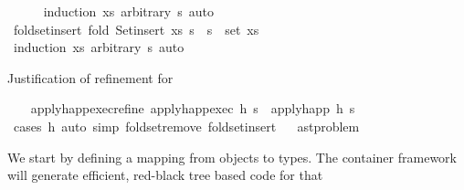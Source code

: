 \begin{isabellebody}
%
\isadelimproof
\ \ \ \ %
\endisadelimproof
%
\isatagproof
{}\isamarkupfalse%
\ {\isacharparenleft}{\kern0pt}induction\ xs\ arbitrary{\isacharcolon}{\kern0pt}\ s{\isacharparenright}{\kern0pt}\ auto%
\endisatagproof
{\isafoldproof}%
%
\isadelimproof
\isanewline
%
\endisadelimproof
\isanewline
\ \ \isamarkupfalse%
\ fold{\isacharunderscore}{\kern0pt}set{\isacharunderscore}{\kern0pt}insert{\isacharcolon}{\kern0pt}\ {\isachardoublequoteopen}fold\ Set{\isachardot}{\kern0pt}insert\ xs\ s\ {\isacharequal}{\kern0pt}\ s\ {\isasymunion}\ set\ xs{\isachardoublequoteclose}\isanewline
%
\isadelimproof
\ \ \ \ %
\endisadelimproof
%
\isatagproof
{}\isamarkupfalse%
\ {\isacharparenleft}{\kern0pt}induction\ xs\ arbitrary{\isacharcolon}{\kern0pt}\ s{\isacharparenright}{\kern0pt}\ auto%
\endisatagproof
{\isafoldproof}%
%
\isadelimproof
%
\endisadelimproof
%
\begin{isamarkuptext}%
Justification of refinement for %
\end{isamarkuptext}\isamarkuptrue%
\ \ \isamarkupfalse%
\ apply{\isacharunderscore}{\kern0pt}happ{\isacharunderscore}{\kern0pt}exec{\isacharunderscore}{\kern0pt}refine{\isacharcolon}{\kern0pt}\ {\isachardoublequoteopen}apply{\isacharunderscore}{\kern0pt}happ{\isacharunderscore}{\kern0pt}exec\ h\ s\ {\isacharequal}{\kern0pt}\ apply{\isacharunderscore}{\kern0pt}happ\ h\ s{\isachardoublequoteclose}\isanewline
%
\isadelimproof
\ \ \ \ %
\endisadelimproof
%
\isatagproof
{}\isamarkupfalse%
\ {\isacharparenleft}{\kern0pt}cases\ h{\isacharparenright}{\kern0pt}\ {\isacharparenleft}{\kern0pt}auto\ simp{\isacharcolon}{\kern0pt}\ fold{\isacharunderscore}{\kern0pt}set{\isacharunderscore}{\kern0pt}remove\ fold{\isacharunderscore}{\kern0pt}set{\isacharunderscore}{\kern0pt}insert{\isacharparenright}{\kern0pt}%
\endisatagproof
{\isafoldproof}%
%
\isadelimproof
\isanewline
%
\endisadelimproof
\isanewline
{}\isamarkupfalse%
\ %
%
\isadelimdocument
%
\endisadelimdocument
%
\isatagdocument
%
\isamarkuptrue%
%
\endisatagdocument
{\isafolddocument}%
%
\isadelimdocument
%
\endisadelimdocument
{}\isamarkupfalse%
\ ast{\isacharunderscore}{\kern0pt}problem\ %
\begin{isamarkuptext}%
We start by defining a mapping from objects to types. The container
    framework will generate efficient, red-black tree based code for that

\end{isamarkuptext}
\end{isabellebody}
